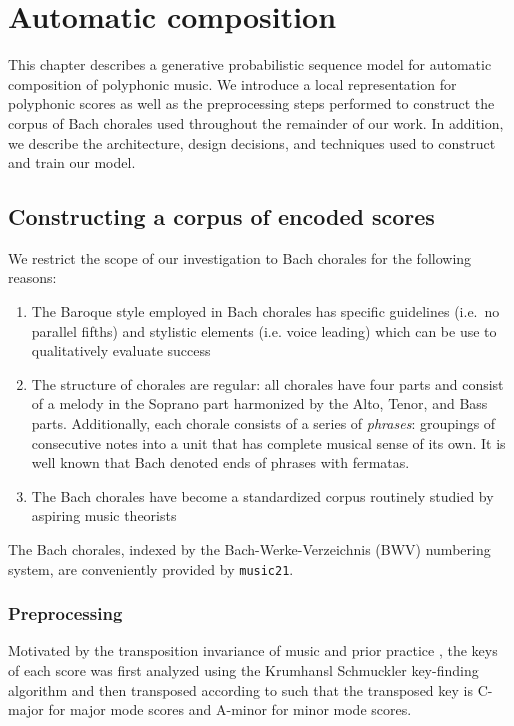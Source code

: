 \documentclass[dissertation.tex]{subfiles}
\begin{document}
\chapter{Automatic composition}

This chapter describes a generative probabilistic sequence model for automatic
composition of polyphonic music. We introduce a local representation for
polyphonic scores as well as the preprocessing steps performed to construct
the corpus of Bach chorales used throughout the remainder of our work. In addition,
we describe the architecture, design decisions, and techniques used to construct
and train our model.

\section{Constructing a corpus of encoded scores}

We restrict the scope of our investigation to Bach chorales for the following reasons:
\begin{enumerate}
  \item The Baroque style employed in Bach chorales has specific guidelines
    \cite{piston1978harmony} (i.e.\ no parallel fifths) and stylistic elements
    (i.e. voice leading) which can be use to qualitatively evaluate success
  \item The structure of chorales are regular: all chorales have four parts and
    consist of a melody in the Soprano part harmonized by the Alto, Tenor, and
    Bass parts. Additionally, each chorale consists of a series of \emph{phrases}:
    groupings of consecutive notes into a unit that has complete musical sense
    of its own\cite{nattiez1990music}. It is well known that Bach
    denoted ends of phrases with fermatas.
  \item The Bach chorales have become a standardized corpus routinely studied
    by aspiring music theorists\cite{white2002guidelines}
\end{enumerate}
The Bach chorales, indexed by the Bach-Werke-Verzeichnis (BWV) numbering
system\cite{butt1999bach}, are conveniently provided by
\texttt{music21}\cite{Scott2015}.

\subsection{Preprocessing}

Motivated by the transposition invariance of music and prior practice
\cite{mozer1994neural} \cite{Eck2002} \cite{franklin2004recurrent}
\cite{franklin2005jazz}, the keys of each score was first analyzed using the
Krumhansl Schmuckler key-finding algorithm \cite{krumhansl2001cognitive} and
then transposed according to  such that the transposed key is
C-major for major mode scores and A-minor for minor mode scores.
\end{document}
